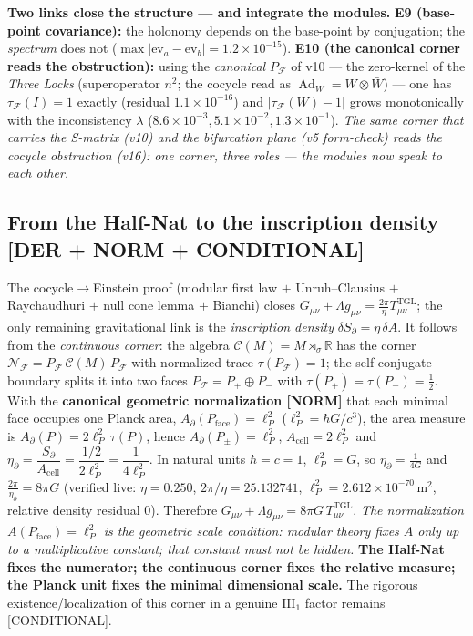 \documentclass[11pt]{article}
\theoremstyle{definition}\newtheorem{deriv}{Derivation}
\begin{document}
\textbf{Two links close the structure --- and integrate the modules.} \textbf{E9 (base-point covariance):} the holonomy depends on the base-point by conjugation; the \emph{spectrum} does not ($\max|\mathrm{ev}_a-\mathrm{ev}_b|=1.2\times10^{-15}$). \textbf{E10 (the canonical corner reads the obstruction):} using the \emph{canonical} $P_{\mathcal F}$ of v10 --- the zero-kernel of the \emph{Three Locks} (superoperator $n^2$; the cocycle read as $\operatorname{Ad}_W=W\otimes\bar W$) --- one has $\tau_{\mathcal F}(I)=1$ exactly (residual $1.1\times10^{-16}$) and $|\tau_{\mathcal F}(W)-1|$ grows monotonically with the inconsistency $\lambda$ ($8.6\times10^{-3}, 5.1\times10^{-2}, 1.3\times10^{-1}$). \emph{The same corner that carries the S-matrix (v10) and the bifurcation plane (v5 form-check) reads the cocycle obstruction (v16): one corner, three roles --- the modules now speak to each other.}

\subsection*{From the Half-Nat to the inscription density \textsf{[DER + NORM + CONDITIONAL]}}

The cocycle$\to$Einstein proof (modular first law $+$ Unruh--Clausius $+$ Raychaudhuri $+$ null cone lemma $+$ Bianchi) closes $G_{\mu\nu}+\Lambda g_{\mu\nu}=\tfrac{2\pi}{\eta}T^{\mathrm{TGL}}_{\mu\nu}$; the only remaining gravitational link is the \emph{inscription density} $\delta S_\partial=\eta\,\delta A$. It follows from the \emph{continuous corner}: the algebra $\mathcal C(M)=M\rtimes_\sigma\mathbb R$ has the corner $\mathcal N_{\mathcal F}=P_{\mathcal F}\,\mathcal C(M)\,P_{\mathcal F}$ with normalized trace $\tau(P_{\mathcal F})=1$; the self-conjugate boundary splits it into two faces $P_{\mathcal F}=P_+\oplus P_-$ with $\tau(P_+)=\tau(P_-)=\tfrac12$. With the \textbf{canonical geometric normalization \textsf{[NORM]}} that each minimal face occupies one Planck area, $A_\partial(P_{\mathrm{face}})=\ell_P^2$ ($\ell_P^2=\hbar G/c^3$), the area measure is $A_\partial(P)=2\ell_P^2\,\tau(P)$, hence $A_\partial(P_\pm)=\ell_P^2$, $A_{\mathrm{cell}}=2\ell_P^2$ and $\eta_\partial=\dfrac{S_\partial}{A_{\mathrm{cell}}}=\dfrac{1/2}{2\ell_P^2}=\dfrac1{4\ell_P^2}$. In natural units $\hbar=c=1$, $\ell_P^2=G$, so $\eta_\partial=\tfrac1{4G}$ and $\tfrac{2\pi}{\eta_\partial}=8\pi G$ (verified live: $\eta=0.250$, $2\pi/\eta=25.132741$, $\ell_P^2=2.612\times10^{-70}\,\mathrm{m}^2$, relative density residual $0$). Therefore $G_{\mu\nu}+\Lambda g_{\mu\nu}=8\pi G\,T^{\mathrm{TGL}}_{\mu\nu}$. \emph{The normalization $A(P_{\mathrm{face}})=\ell_P^2$ is the geometric scale condition: modular theory fixes $A$ only up to a multiplicative constant; that constant must not be hidden.} \textbf{The Half-Nat fixes the numerator; the continuous corner fixes the relative measure; the Planck unit fixes the minimal dimensional scale.} The rigorous existence/localization of this corner in a genuine $\mathrm{III}_1$ factor remains \textsf{[CONDITIONAL]}.
\end{document}
